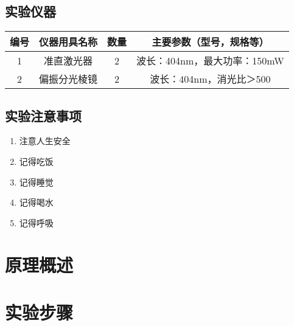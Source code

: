 \documentclass[no-math,zihao = -4]{ctexart} %
\numberwithin{equation}{section}%
\begin{document}
    \subsection{实验仪器}
        \begin{center}
            \begin{tabular}[c]{cccc}
                \toprule
                    编号   &仪器用具名称 &  数量   &主要参数（型号，规格等）\\ 
                \midrule
                    1    & 准直激光器   & 2 & 波长：404nm，最大功率：150mW  \\ 
                    2    & 偏振分光棱镜  & 2 & 波长：404nm，消光比＞500 \\ 
                \bottomrule
            \end{tabular}
            \label{tab:实验用具}
        \end{center}

    \subsection{实验注意事项}
        \begin{enumerate}
            \item 注意人生安全
            \item 记得吃饭
            \item 记得睡觉
            \item 记得喝水
            \item 记得呼吸
        \end{enumerate}
\section{原理概述}
\section{实验步骤}
\end{document}
